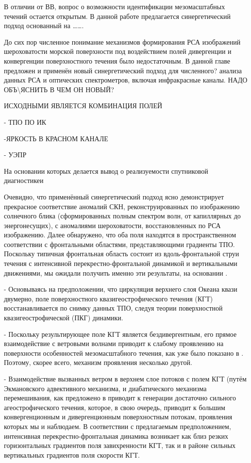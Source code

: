 {В отличии от ВВ, вопрос о возможности идентификации мезомасштабных течений остается открытым. В данной работе предлагается синергетический подход основанный на \dots \dots .

 

До сих пор численное понимание механизмов формирования РСА изображений шероховатости морской поверхности под воздействием полей дивергенции и конвергенции поверхностного течения было недостаточным. В данной главе предложен и применён новый синергетический подход для численного? анализа данных РСА и оптических спектрометров, включая инфракрасные каналы. НАДО ОБЪ\textbackslash ЯСНИТЬ В ЧЕМ ОН НОВЫЙ?

ИСХОДНЫМИ ЯВЛЯЕТСЯ КОМБИНАЦИЯ ПОЛЕЙ

- ТПО ПО ИК

-ЯРКОСТЬ В КРАСНОМ КАНАЛЕ

- УЭПР 



На основании которых делается вывод о реализуемости спутниковой диагностикеи 

Очевидно, что применённый синергетический подход ясно демонстрирует прекрасное соответствие аномалий СКН, реконструированных по изображению солнечного блика (сформированных полным спектром волн, от капиллярных до энергонесущих), с аномалиями шероховатости, восстановленных по РСА изображению. Далее обнаружено, что оба поля находятся в пространственном соответствии с фронтальными областями, представляющими градиенты ТПО. Поскольку типичная фронтальная область состоит из вдоль-фронтальной струи течения с интенсивной перекрестно-фронтальной динамикой и вертикальными движениями, мы ожидали получить именно эти результаты, на основании \citep{Kudryavtsev2005,Johannessen2005}.

- Основываясь на предположении, что циркуляция верхнего слоя Океана квази двумерно, поле поверхностного квазигеострофического течения (КГТ) восстанавливается по снимку данных ТПО, следуя теории поверхностной квазигеострофической (ПКГ) динамики. 

- Поскольку результирующее поле КГТ является бездивергентным, его прямое взаимодействие с ветровыми волнами приводит к слабому проявлению на поверхности особенностей мезомасштабного течения, как уже было показано в \citep{Kudryavtsev2005,Johannessen2005}. Поэтому, скорее всего, механизм проявления несколько другой. 

- Взаимодействие вызванных ветром в верхнем слое потоков с полем КГТ (путём Экмановского адвективного механизма, и диабатического механизма перемешивания, как предложено в \citep{Klein1990,Garrett1981}  приводит к генерации достаточно сильного агеострофического течения, которое, в свою очередь, приводит к большим конвергенционным и дивергенционным поверхностным потокам, проявления которых мы и наблюдаем. В соответствии с предлагаемым предположением, интенсивная перекрестно-фронтальная динамика возникает как близ резких горизонтальных градиентов поля завихренности КГТ, так и в районе сильных вертикальных градиентов поля скорости КГТ.

}
